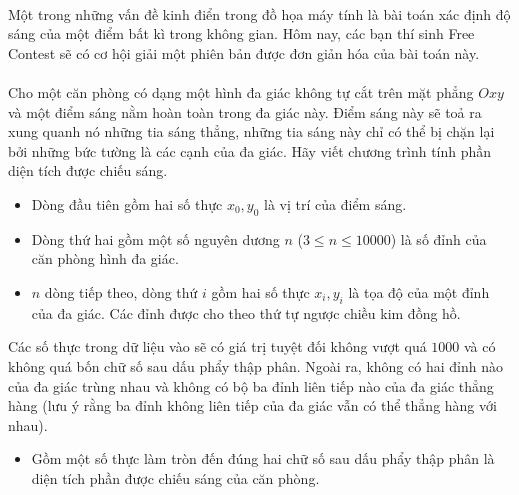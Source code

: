 \documentclass[11pt,a4paper,oneside]{article}
\begin{document}
\\
Một trong những vấn đề kinh điển trong đồ họa máy tính là bài toán xác định độ sáng của một điểm bất kì trong không gian. Hôm nay, các bạn thí sinh Free Contest sẽ có cơ hội giải một phiên bản được đơn giản hóa của bài toán này. \\\\
Cho một căn phòng có dạng một hình đa giác không tự cắt trên mặt phẳng $Oxy$ và một điểm sáng nằm hoàn toàn trong đa giác này. Điểm sáng này sẽ toả ra xung quanh nó những tia sáng thẳng, những tia sáng này chỉ có thể bị chặn lại bởi những bức tường là các cạnh của đa giác. Hãy viết chương trình tính phần diện tích được chiếu sáng.
\begin{itemize}
\item Dòng đầu tiên gồm hai số thực $x_0, y_0$ là vị trí của điểm sáng.
\item Dòng thứ hai gồm một số nguyên dương $n$ ($3 \leq n \leq 10000$) là số đỉnh của căn phòng hình đa giác.
\item $n$ dòng tiếp theo, dòng thứ $i$ gồm hai số thực $x_i, y_i$ là tọa độ của một đỉnh của đa giác. Các đỉnh được cho theo thứ tự ngược chiều kim đồng hồ.
\end{itemize}
Các số thực trong dữ liệu vào sẽ có giá trị tuyệt đối không vượt quá $1000$ và có không quá bốn chữ số sau dấu phẩy thập phân. Ngoài ra, không có hai đỉnh nào của đa giác trùng nhau và không có bộ ba đỉnh liên tiếp nào của đa giác thẳng hàng (lưu ý rằng ba đỉnh không liên tiếp của đa giác vẫn có thể thẳng hàng với nhau).
\begin{itemize}
\item Gồm một số thực làm tròn đến đúng hai chữ số sau dấu phẩy thập phân là diện tích phần được chiếu sáng của căn phòng.
\end{itemize}
\begin{example}
%
\end{example}
\newpage
{}
\end{document}
